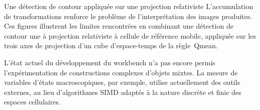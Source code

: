 %
{}%
{Une d\'etection de contour appliqu\'ee sur une projection relativiste}%
{L'accumulation de transformations renforce le probl\`eme de
  l'interpr\'etation des images produites. %
  Ces figures illustrent les limites rencontr\'ees en combinant une
  d\'etection de contour une \`a projection relativiste \`a cellule de
  r\'ef\'erence mobile, appliqu\'ee sur les trois axes de projection d'un
  cube d'espace-temps de la r\`egle~{Qmean}.}

L'\'etat actuel du d\'eveloppement du workbench n'a pas encore permis
l'exp\'erimentation de constructions complexes d'objets mixtes. %
La mesure de variables d'\'etats macroscopiques, par exemple, utilise
actuellement des outils externes, au lieu d'algorithmes SIMD adapt\'es \`a
la nature discr\`ete et finie des espaces cellulaires. %

